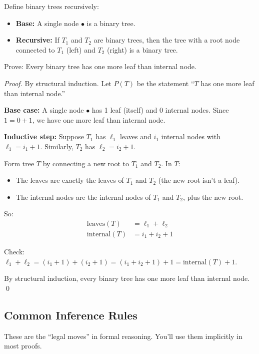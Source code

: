\begin{example}
Define binary trees recursively:
\begin{itemize}
  \item \textbf{Base:} A single node $\bullet$ is a binary tree.
  \item \textbf{Recursive:} If $T_1$ and $T_2$ are binary trees, then the tree with a root node connected to $T_1$ (left) and $T_2$ (right) is a binary tree.
\end{itemize}

Prove: Every binary tree has one more leaf than internal node.

\emph{Proof.} By structural induction. Let $P(T)$ be the statement ``$T$ has one more leaf than internal node.''

\textbf{Base case:} A single node $\bullet$ has 1 leaf (itself) and 0 internal nodes. Since $1 = 0 + 1$, we have one more leaf than internal node. \checkmark

\textbf{Inductive step:} Suppose $T_1$ has $\ell_1$ leaves and $i_1$ internal nodes with $\ell_1 = i_1 + 1$. Similarly, $T_2$ has $\ell_2 = i_2 + 1$.

Form tree $T$ by connecting a new root to $T_1$ and $T_2$. In $T$:
\begin{itemize}
  \item The leaves are exactly the leaves of $T_1$ and $T_2$ (the new root isn't a leaf).
  \item The internal nodes are the internal nodes of $T_1$ and $T_2$, plus the new root.
\end{itemize}

So:
\begin{align*}
\text{leaves}(T) &= \ell_1 + \ell_2 \\
\text{internal}(T) &= i_1 + i_2 + 1
\end{align*}

Check: $\ell_1 + \ell_2 = (i_1 + 1) + (i_2 + 1) = (i_1 + i_2 + 1) + 1 = \text{internal}(T) + 1$. \checkmark

By structural induction, every binary tree has one more leaf than internal node. \qed
\end{example}

\subsection*{Common Inference Rules}

These are the ``legal moves'' in formal reasoning. You'll use them implicitly in most proofs.

